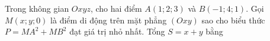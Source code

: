 \begin{ex}
Trong không gian $Oxyz$, cho hai điểm $A(1;2;3)$ và $B(-1;4;1)$. Gọi $M(x;y;0)$ là điểm di động trên mặt phẳng $(Oxy)$ sao cho biểu thức $P=MA^2+MB^2$ đạt giá trị nhỏ nhất. Tổng $S=x+y$ bằng
\end{ex}
